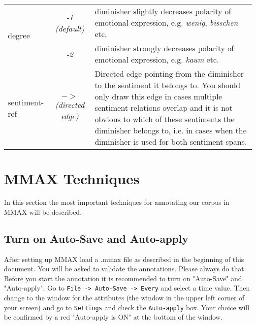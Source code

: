 \documentclass[11pt,a4paper]{article}
\begin{document}
\begin{tabular}{|l|c|p{}|}\hline

  \multirow{2}{*}{degree} & \textit{-1 (default)} & diminisher
  slightly decreases polarity of emotional
  expression, e.g. \textit{wenig},
  \textit{bisschen} etc.\\\cline{2-3}

  & \textit{-2} & diminisher strongly decreases polarity of
  emotional expression, e.g. \textit{kaum} etc.\\\hline


  sentiment-ref & \textit{$->$\newline(directed edge)} & Directed
  edge pointing from the diminisher to the sentiment it belongs
  to. You should only draw this edge in cases
  multiple sentiment relations overlap and it is not obvious
  to which of these sentiments the diminisher belongs to,
  i.e. in cases when the diminisher is used for both
  sentiment spans.\\\hline

\end{tabular}


\section{MMAX Techniques}
In this section the most important techniques for annotating our corpus in MMAX will be described.

\subsection{Turn on Auto-Save and Auto-apply}
After setting up MMAX load a .mmax file as described in the beginning of this document. You will be asked to validate the annotations. Please always do that. 
Before you start the annotation it is recommended to turn on "Auto-Save" and "Auto-apply". Go to \texttt{File -> Auto-Save -> Every} and select a time value. 
Then change to the window for the attributes (the window in the upper left corner of your screen) and go to \texttt{Settings} and check the \texttt{Auto-apply} box. 
Your choice will be confirmed by a red "Auto-apply is ON" at the bottom of the window. \newline
\end{document}
